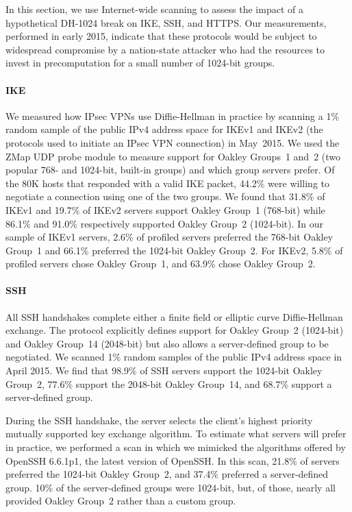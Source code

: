 In this section, we use Internet-wide scanning to assess the impact of
a hypothetical DH-1024 break on IKE, SSH, and
HTTPS\@.  Our measurements, performed in early 2015, indicate that these protocols would be subject to widespread compromise by a
nation-state attacker who had the resources to invest in precomputation
for a small number of 1024-bit groups.

\paragraph{IKE}
We measured how IPsec VPNs use Diffie-Hellman in practice by
scanning a 1\% random sample of the public IPv4 address space for IKEv1 and
IKEv2 (the protocols used to initiate an IPsec VPN connection) in May~2015. We
used the ZMap UDP probe module to measure support for Oakley Groups~1 and~2
(two popular 768- and 1024-bit, built-in groups) and which group servers
prefer. Of the 80K hosts that responded with a valid IKE packet, 44.2\% were willing
to negotiate a connection using one of the two groups. We found that 31.8\% of IKEv1 and 19.7\% of IKEv2 servers support Oakley Group~1
(768-bit) while 86.1\% and 91.0\% respectively supported Oakley Group~2
(1024-bit).  In our sample of IKEv1 servers, 2.6\% of profiled servers preferred
the 768-bit Oakley Group~1 and 66.1\% preferred the 1024-bit Oakley
Group~2. For IKEv2, 5.8\% of profiled servers chose Oakley Group~1, and 63.9\%
chose Oakley Group~2.

\paragraph{SSH}
All SSH handshakes complete either a finite field or elliptic
curve Diffie-Hellman exchange. The protocol
explicitly defines support for Oakley Group~2 (1024-bit) and Oakley Group~14
(2048-bit) but also allows a server-defined group to be negotiated. We scanned 1\% random samples of the public IPv4 address
space in April 2015.  We find that 98.9\% of SSH servers support the 1024-bit
Oakley Group~2, 77.6\% support the 2048-bit Oakley Group~14, and 68.7\% support
a server-defined group\@.

During the SSH handshake, the server selects the client's highest
priority mutually supported key exchange algorithm.  To
estimate what servers will prefer in practice, we performed a scan in which we mimicked the algorithms offered
by OpenSSH 6.6.1p1, the latest version of OpenSSH\@. In this scan, 21.8\% of
servers preferred the 1024-bit Oakley Group~2, and 37.4\% preferred a
server-defined group. 10\% of the server-defined groups were 1024-bit, but, of
those, nearly all provided Oakley Group~2 rather than a custom group.


